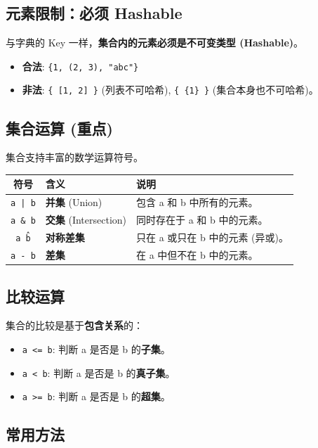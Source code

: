 \documentclass[12pt, a4paper]{article}
\begin{document}
\subsection{元素限制：必须 Hashable}

与字典的 Key 一样，\textbf{集合内的元素必须是不可变类型 (Hashable)}。
\begin{itemize}
    \item \textbf{合法}: \texttt{\{1, (2, 3), "abc"\}}
    \item \textbf{非法}: \texttt{\{ [1, 2] \}} (列表不可哈希), \texttt{\{ \{1\} \}} (集合本身也不可哈希)。
\end{itemize}

\subsection{集合运算 (重点)}

集合支持丰富的数学运算符号。

\begin{table}[ht]
\centering
\begin{tabular}{c l p{7cm}}
\toprule
\textbf{符号} & \textbf{含义} & \textbf{说明} \\
\midrule
\texttt{a | b} & \textbf{并集} (Union) & 包含 a 和 b 中所有的元素。 \\
\texttt{a \& b} & \textbf{交集} (Intersection) & 同时存在于 a 和 b 中的元素。 \\
\texttt{a \^ b} & \textbf{对称差集} & 只在 a 或只在 b 中的元素 (异或)。 \\
\texttt{a - b} & \textbf{差集} & 在 a 中但不在 b 中的元素。 \\
\bottomrule
\end{tabular}
\end{table}

\subsection{比较运算}

集合的比较是基于\textbf{包含关系}的：
\begin{itemize}
    \item \texttt{a <= b}: 判断 a 是否是 b 的\textbf{子集}。
    \item \texttt{a < b}: 判断 a 是否是 b 的\textbf{真子集}。
    \item \texttt{a >= b}: 判断 a 是否是 b 的\textbf{超集}。
\end{itemize}

\subsection{常用方法}
\end{document}
